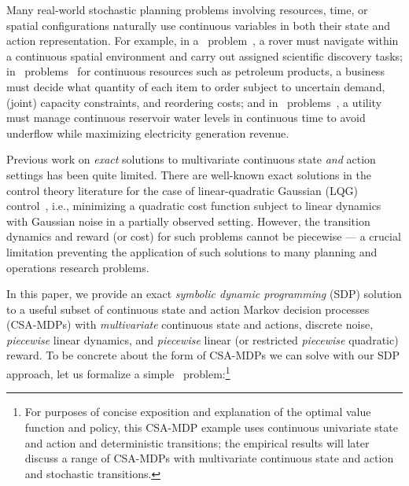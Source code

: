 \label{sec:intro}

Many real-world stochastic planning problems involving resources,
time, or spatial configurations naturally use continuous variables in
both their state and action representation.  For example, in a
\MarsRover\ problem~\cite{bresina02}, a rover must navigate within a
continuous spatial environment and carry out assigned scientific
discovery tasks; in \InventoryControl\ problems~\cite{Mahootchi2009}
for continuous resources such as petroleum products, a business must
decide what quantity of each item to order subject to uncertain
demand, (joint) capacity constraints, and reordering costs; and in
\WaterReservoir\ problems~\cite{reservoir}, a utility must manage continuous
reservoir water levels in continuous time to avoid underflow 
while maximizing electricity generation revenue.

Previous work on \emph{exact} solutions to multivariate continuous
state \emph{and} action settings has been quite limited.  There are
well-known exact solutions in the control theory literature for the
case of linear-quadratic Gaussian (LQG) control~\cite{lqgc}, i.e.,
minimizing a quadratic cost function subject to linear dynamics with
Gaussian noise in a partially observed setting.  However, the
transition dynamics and reward (or cost) for such problems 
cannot be piecewise --- a crucial limitation preventing the application
of such solutions to many planning and operations research problems. 

In this paper, we provide an exact \emph{symbolic dynamic programming} (SDP)
solution to a useful subset of continuous state and action Markov
decision processes (CSA-MDPs) with \emph{multivariate} continuous
state and actions, discrete noise, \emph{piecewise} linear dynamics,
and \emph{piecewise} linear (or restricted \emph{piecewise} quadratic)
reward.  To be concrete about the form of CSA-MDPs we can solve with
our SDP approach, let us formalize a simple \MarsRover\
problem:\footnote{For purposes of concise exposition and explanation
of the optimal value function and policy, this CSA-MDP example uses
continuous univariate state and action and deterministic transitions;
the empirical results will later discuss a range of CSA-MDPs with
multivariate continuous state and action and stochastic transitions.}

